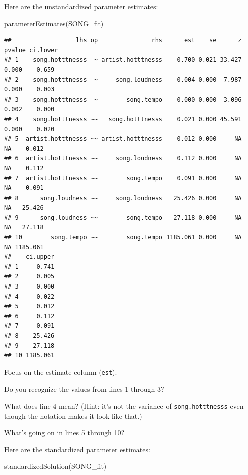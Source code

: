 \documentclass[
]{book}
\newenvironment{Shaded}{\begin{snugshade}}{\end{snugshade}}
\newcommand{\FunctionTok}[1]{\textcolor[rgb]{0.00,0.00,0.00}{#1}}
\newcommand{\NormalTok}[1]{#1}
\begin{document}
Here are the unstandardized parameter estimates:

\begin{Shaded}
\begin{Highlighting}[]
\FunctionTok{parameterEstimates}\NormalTok{(SONG\_fit)}
\end{Highlighting}
\end{Shaded}

\begin{verbatim}
##                  lhs op               rhs      est    se      z pvalue ci.lower
## 1    song.hotttnesss  ~ artist.hotttnesss    0.700 0.021 33.427  0.000    0.659
## 2    song.hotttnesss  ~     song.loudness    0.004 0.000  7.987  0.000    0.003
## 3    song.hotttnesss  ~        song.tempo    0.000 0.000  3.096  0.002    0.000
## 4    song.hotttnesss ~~   song.hotttnesss    0.021 0.000 45.591  0.000    0.020
## 5  artist.hotttnesss ~~ artist.hotttnesss    0.012 0.000     NA     NA    0.012
## 6  artist.hotttnesss ~~     song.loudness    0.112 0.000     NA     NA    0.112
## 7  artist.hotttnesss ~~        song.tempo    0.091 0.000     NA     NA    0.091
## 8      song.loudness ~~     song.loudness   25.426 0.000     NA     NA   25.426
## 9      song.loudness ~~        song.tempo   27.118 0.000     NA     NA   27.118
## 10        song.tempo ~~        song.tempo 1185.061 0.000     NA     NA 1185.061
##    ci.upper
## 1     0.741
## 2     0.005
## 3     0.000
## 4     0.022
## 5     0.012
## 6     0.112
## 7     0.091
## 8    25.426
## 9    27.118
## 10 1185.061
\end{verbatim}

Focus on the estimate column (\texttt{est}).

Do you recognize the values from lines 1 through 3?

What does line 4 mean? (Hint: it's not the variance of \texttt{song.hotttnesss} even though the notation makes it look like that.)

What's going on in lines 5 through 10?

Here are the standardized parameter estimates:

\begin{Shaded}
\begin{Highlighting}[]
\FunctionTok{standardizedSolution}\NormalTok{(SONG\_fit)}
\end{Highlighting}
\end{Shaded}
\end{document}
